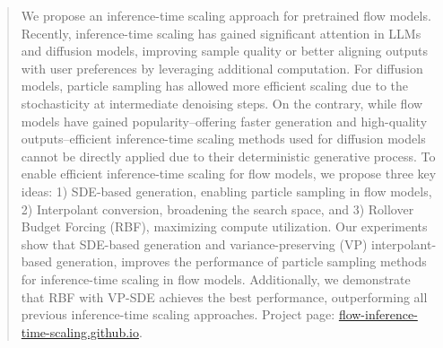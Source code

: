 \begin{abstract}
\vspace{-0.8\baselineskip}
We propose an inference-time scaling approach for pretrained flow models. 
Recently, inference-time scaling has gained significant attention in LLMs and diffusion models, improving sample quality or better aligning outputs with user preferences by leveraging additional computation. 
For diffusion models, particle sampling has allowed more efficient scaling due to the stochasticity at intermediate denoising steps. 
On the contrary, while flow models have gained popularity--offering faster generation and high-quality outputs--efficient inference-time scaling methods used for diffusion models cannot be directly applied due to their deterministic generative process. 
To enable efficient inference-time scaling for flow models, we propose three key ideas: 1) SDE-based generation, enabling particle sampling in flow models, 2) Interpolant conversion, broadening the search space, and 3) Rollover Budget Forcing (RBF), maximizing compute utilization. 
Our experiments show that SDE-based generation and variance-preserving (VP) interpolant-based generation, improves the performance of particle sampling methods for inference-time scaling in flow models. 
Additionally, we demonstrate that RBF with VP-SDE achieves the best performance, outperforming all previous inference-time scaling approaches. Project page: \textcolor{magenta}{\url{flow-inference-time-scaling.github.io}}.
\end{abstract}

